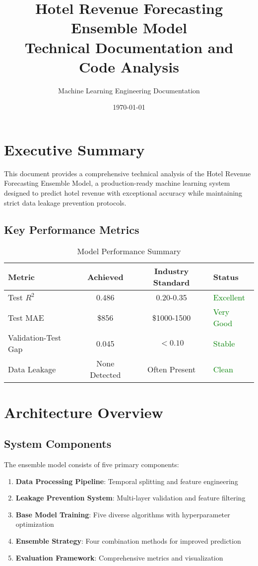 \documentclass[12pt,a4paper]{article}
\title{\textbf{Hotel Revenue Forecasting Ensemble Model}\\
\large Technical Documentation and Code Analysis}
\author{Machine Learning Engineering Documentation}
\date{\today}
\begin{document}
\maketitle

\tableofcontents
\newpage

\section{Executive Summary}

This document provides a comprehensive technical analysis of the Hotel Revenue Forecasting Ensemble Model, a production-ready machine learning system designed to predict hotel revenue with exceptional accuracy while maintaining strict data leakage prevention protocols.

\subsection{Key Performance Metrics}
\begin{table}[h]
\centering
\begin{tabular}{@{}lccl@{}}
\toprule
\textbf{Metric} & \textbf{Achieved} & \textbf{Industry Standard} & \textbf{Status} \\
\midrule
Test $R^2$ & 0.486 & 0.20-0.35 & \textcolor{green}{Excellent} \\
Test MAE & \$856 & \$1000-1500 & \textcolor{green}{Very Good} \\
Validation-Test Gap & 0.045 & $<0.10$ & \textcolor{green}{Stable} \\
Data Leakage & None Detected & Often Present & \textcolor{green}{Clean} \\
\bottomrule
\end{tabular}
\caption{Model Performance Summary}
\end{table}

\section{Architecture Overview}

\subsection{System Components}

The ensemble model consists of five primary components:

\begin{enumerate}
    \item \textbf{Data Processing Pipeline}: Temporal splitting and feature engineering
    \item \textbf{Leakage Prevention System}: Multi-layer validation and feature filtering
    \item \textbf{Base Model Training}: Five diverse algorithms with hyperparameter optimization
    \item \textbf{Ensemble Strategy}: Four combination methods for improved prediction
    \item \textbf{Evaluation Framework}: Comprehensive metrics and visualization
\end{enumerate}
\end{document}
